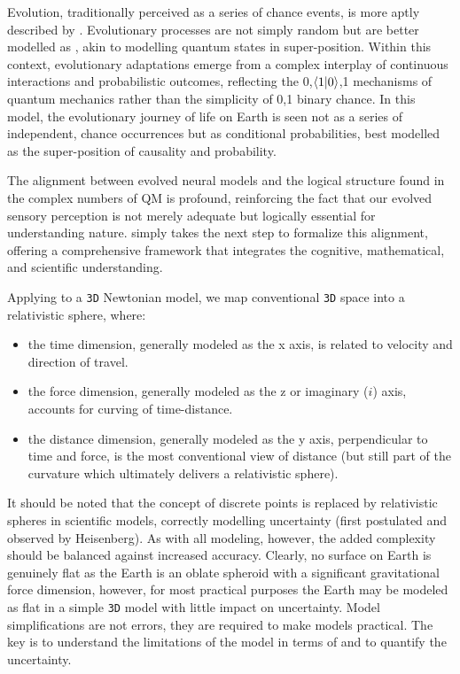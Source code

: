 \documentclass[12pt]{article}
\begin{document}
Evolution, traditionally perceived as a series of chance events, is more aptly described by \iR{}. Evolutionary processes are not simply random but are better modelled as \iR{}, akin to modelling quantum states in super-position. Within this context, evolutionary adaptations emerge from a complex interplay of continuous interactions and probabilistic outcomes, reflecting the {0,\(\langle 1 | 0 \rangle\),1} mechanisms of quantum mechanics rather than the simplicity of {0,1} binary chance. In this model, the evolutionary journey of life on Earth is seen not as a series of independent, chance occurrences but as conditional probabilities, best modelled as the super-position of causality and probability.

The alignment between evolved neural models and the logical structure found in the complex numbers of QM is profound, reinforcing the fact that our evolved sensory perception is not merely adequate but logically essential for understanding nature. \iR{} simply takes the next step to formalize this alignment, offering a comprehensive framework that integrates the cognitive, mathematical, and scientific understanding.

Applying \iR{} to a \texttt{3D} Newtonian model, we map conventional \texttt{3D} space into a \iR{} relativistic sphere, where:
\begin{itemize}
    \item the time dimension, generally modeled as the x axis, is related to velocity and direction of travel.
    \item the force dimension, generally modeled as the z or imaginary (\(i\)) axis, accounts for curving of time-distance.
    \item the distance dimension, generally modeled as the y axis, perpendicular to time and force, is the most conventional view of distance (but still part of the \iR{} curvature which ultimately delivers a relativistic sphere).
\end{itemize}

It should be noted that the concept of discrete points is replaced by relativistic spheres in \iR{} scientific models, correctly modelling uncertainty (first postulated and observed by Heisenberg). As with all modeling, however, the added complexity should be balanced against increased accuracy. Clearly, no surface on Earth is genuinely flat as the Earth is an oblate spheroid with a significant gravitational force dimension, however, for most practical purposes the Earth may be modeled as flat in a simple \texttt{3D} model with little impact on uncertainty. Model simplifications are not errors, they are required to make models practical. The key is to understand the limitations of the model in terms of \iR{} and to quantify the uncertainty.
\end{document}
